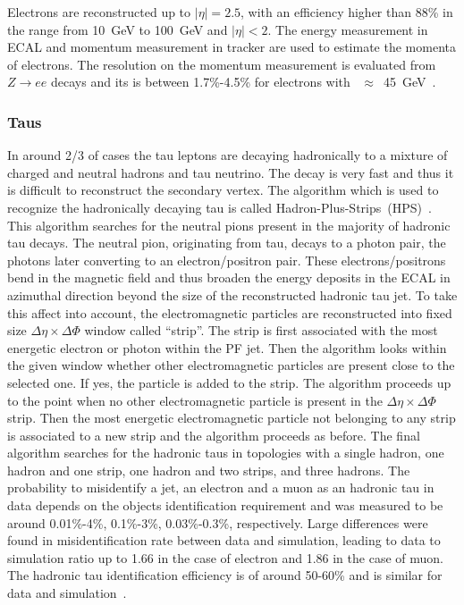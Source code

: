 Electrons are reconstructed up to $|\eta|=2.5$,  with an efficiency higher than 88\% in the \pt range from 10~GeV to 100~GeV and $|\eta|<2$. The energy measurement in ECAL and momentum measurement in tracker are used to estimate the momenta of electrons. The resolution on the momentum measurement is evaluated from $Z \rightarrow ee$ decays and its is between 1.7\%-4.5\% for electrons with  \pt~$\approx$~45~GeV~\cite{Khachatryan:2015hwa}.



\subsubsection{Taus}

In around 2/3 of cases the tau leptons are decaying hadronically to a mixture of charged and neutral hadrons and tau neutrino. The decay is very fast and thus it is difficult to reconstruct the secondary vertex. The algorithm which is used to recognize the hadronically decaying tau is called Hadron-Plus-Strips~(HPS)~\cite{CMS:2016gvn}. This algorithm searches for the neutral pions present in the majority of hadronic tau decays. The neutral pion, originating from tau, decays to a photon pair, the photons later converting to an electron/positron pair. These electrons/positrons bend in the magnetic field and thus broaden the energy deposits in the ECAL in azimuthal direction beyond the size of the reconstructed hadronic tau jet. To take this affect into account, the electromagnetic particles  are reconstructed into fixed size $\Delta \eta \times \Delta \Phi$ window called ``strip''. The strip is first associated with the most energetic electron or photon within the PF jet. Then the algorithm looks within the given window whether other electromagnetic particles are present close to the selected one. If yes, the particle is added to the strip. The algorithm proceeds up to the point when no other electromagnetic particle is present in the $\Delta \eta \times \Delta \Phi$ strip. Then the most energetic electromagnetic particle not belonging to any strip is associated to a new strip and the algorithm proceeds as before. The final algorithm searches for the hadronic taus in topologies with a single hadron, one hadron and one strip, one hadron and two strips, and three hadrons. The probability to misidentify a jet, an electron and a muon as an hadronic tau in data depends on the objects identification requirement and was measured to be around 0.01\%-4\%, 0.1\%-3\%, 0.03\%-0.3\%, respectively. Large differences were found in misidentification rate between data and simulation, leading to data to simulation ratio up to 1.66 in the case of electron and 1.86 in the case of muon. The hadronic tau identification efficiency is of around 50-60\% and is similar for data and simulation~\cite{Khachatryan:2015dfa}.

